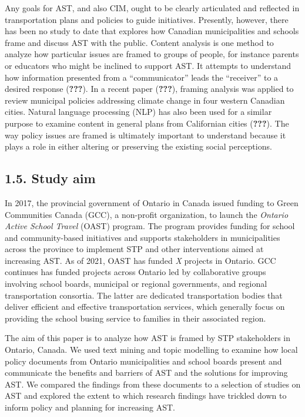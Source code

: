 \documentclass[]{elsarticle} %
\begin{document}
Any goals for AST, and also CIM, ought to be clearly articulated and
reflected in transportation plans and policies to guide initiatives.
Presently, however, there has been no study to date that explores how
Canadian municipalities and schools frame and discuss AST with the
public. Content analysis is one method to analyze how particular issues
are framed to groups of people, for instance parents or educators who
might be inclined to support AST. It attempts to understand how
information presented from a ``communicator'' leads the ``receiver'' to
a desired response ({\textbf{???}}). In a recent paper ({\textbf{???}}),
framing analysis was applied to review municipal policies addressing
climate change in four western Canadian cities. Natural language
processing (NLP) has also been used for a similar purpose to examine
content in general plans from Californian cities ({\textbf{???}}). The
way policy issues are framed is ultimately important to understand
because it plays a role in either altering or preserving the existing
social perceptions.

\hypertarget{study-aim}{%
\subsection{1.5. Study aim}\label{study-aim}}

In 2017, the provincial government of Ontario in Canada issued funding
to Green Communities Canada (GCC), a non-profit organization, to launch
the \emph{Ontario Active School Travel} (OAST) program. The program
provides funding for school and community-based initiatives and supports
stakeholders in municipalities across the province to implement STP and
other interventions aimed at increasing AST. As of 2021, OAST has funded
\emph{X} projects in Ontario. GCC continues has funded projects across
Ontario led by collaborative groups involving school boards, municipal
or regional governments, and regional transportation consortia. The
latter are dedicated transportation bodies that deliver efficient and
effective transportation services, which generally focus on providing
the school busing service to families in their associated region.

The aim of this paper is to analyze how AST is framed by STP
stakeholders in Ontario, Canada. We used text mining and topic modelling
to examine how local policy documents from Ontario municipalities and
school boards present and communicate the benefits and barriers of AST
and the solutions for improving AST. We compared the findings from these
documents to a selection of studies on AST and explored the extent to
which research findings have trickled down to inform policy and planning
for increasing AST.
\end{document}
